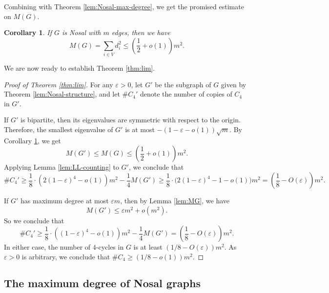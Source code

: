 \documentclass[11pt,a4paper]{article}
\newtheorem{cor}[theorem]{Corollary}
\theoremstyle{definition}
\theoremstyle{remark}
\begin{document}
Combining with Theorem \ref{lem:Nosal-max-degree}, we get the promised estimate on $M(G)$. 

\begin{cor}
    \label{cor:MG}
    If $G$ is Nosal with $m$ edges, then we have
    \[  M(G)= \sum_{i \in V} d_i^2 \leq \left( \frac{1}{2} + o(1) \right) m^2. \] 
\end{cor}

We are now ready to establish Theorem \ref{thm:lim}.

\begin{proof}[Proof of Theorem \ref{thm:lim}] 
For any $\varepsilon > 0$, let $G'$ be the subgraph of $G$ given by Theorem \ref{lem:Nosal-structure}, and let $\#C_4'$ denote the number of copies of $C_4$ in $G'$. 

If $G'$ is bipartite, then its eigenvalues 
are symmetric with respect to the origin. Therefore, the smallest eigenvalue of $G'$ is at most $-(1 - \varepsilon - o(1)) \sqrt{m}$. By Corollary \ref{cor:MG}, we get 
\[  M(G') \le M(G) \le \left(\frac{1}{2} + o(1) \right)m^2. \]
Applying Lemma \ref{lem:LL-counting} to $G'$, we conclude that
$$\#C_4' \geq \frac{1}{8}\cdot \left(2(1 - \varepsilon)^4 - o(1) \right) m^2 - \frac{1}{4} M(G') \geq \frac{1}{8}\cdot \big(2(1 - \varepsilon)^4 - 1 - o(1) \big) m^2 
= \left( \frac{1}{8} - O(\varepsilon) \right) m^2.$$

If $G'$ has maximum degree at most $\varepsilon m$, then by Lemma \ref{lem:MG}, we have
\[ M(G') \le \varepsilon m^2 + o(m^2). \]
So we conclude that
$$\#C_4' \geq \frac{1}{8}\cdot \left( (1 - \varepsilon)^4 - o(1) \right) m^2 - \frac{1}{4} M(G') = \left( \frac{1}{8} - O(\varepsilon) \right) m^2.$$
In either case, the number of $4$-cycles in $G$ is at least $(1 /8 - O(\varepsilon)) m^2$. As $\varepsilon > 0$ is arbitrary, we conclude that $\#C_4 \geq (1 /8 - o(1)) m^2$.
\end{proof}





\subsection{The maximum degree of Nosal graphs}
\end{document}
